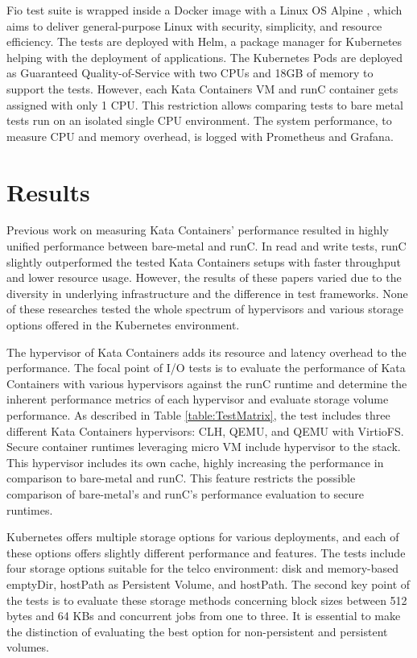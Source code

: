 Fio test suite is wrapped inside a Docker image with a Linux OS Alpine \cite{Alpine}, which aims to deliver general-purpose Linux with security, simplicity, and resource efficiency. The tests are deployed with Helm\cite{Helm}, a package manager for Kubernetes helping with the deployment of applications. The Kubernetes Pods are deployed as Guaranteed Quality-of-Service with two CPUs and 18GB of memory to support the tests. However, each Kata Containers VM and runC container gets assigned with only 1 CPU. This restriction allows comparing tests to bare metal tests run on an isolated single CPU environment. The system performance, to measure CPU and memory overhead, is logged with Prometheus and Grafana.

\section{Results}

Previous work \cite{EverartsdeVelp2020}\cite{Kumar2020}\cite{StackHPCKata}\cite{Randazzo2019} on measuring Kata Containers' performance resulted in highly unified performance between bare-metal and runC. In read and write tests, runC slightly outperformed the tested Kata Containers setups with faster throughput and lower resource usage. However, the results of these papers varied due to the diversity in underlying infrastructure and the difference in test frameworks. None of these researches tested the whole spectrum of hypervisors and various storage options offered in the Kubernetes environment.

The hypervisor of Kata Containers adds its resource and latency overhead to the performance. The focal point of I/O tests is to evaluate the performance of Kata Containers with various hypervisors against the runC runtime and determine the inherent performance metrics of each hypervisor and evaluate storage volume performance. As described in Table \ref{table:TestMatrix}, the test includes three different Kata Containers hypervisors: CLH, QEMU, and QEMU with VirtioFS. Secure container runtimes leveraging micro VM include hypervisor to the stack. This hypervisor includes its own cache, highly increasing the performance in comparison to bare-metal and runC. This feature restricts the possible comparison of bare-metal's and runC's performance evaluation to secure runtimes.

Kubernetes offers multiple storage options for various deployments, and each of these options offers slightly different performance and features. The tests include four storage options suitable for the telco environment: disk and memory-based emptyDir, hostPath as Persistent Volume, and hostPath. The second key point of the tests is to evaluate these storage methods concerning block sizes between 512 bytes and 64 KBs and concurrent jobs from one to three. It is essential to make the distinction of evaluating the best option for non-persistent and persistent volumes.

